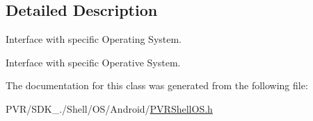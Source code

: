 \subsection{Detailed Description}
Interface with specific Operating System. 

Interface with specific Operative System.



 

The documentation for this class was generated from the following file\+:\begin{DoxyCompactItemize}
\item 
P\+V\+R/\+S\+D\+K\+\_./\+Shell/\+O\+S/\+Android/\hyperlink{_android_2_p_v_r_shell_o_s_8h}{P\+V\+R\+Shell\+O\+S.\+h}\end{DoxyCompactItemize}
